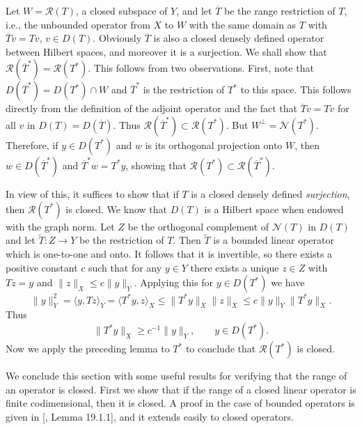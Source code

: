 \begin{Proof}
{Let $W=\mathcal R(T)$, a closed subspace of $Y$, and let $\overline T$ be the range restriction of $T$, i.e., the unbounded operator from $X$ to $W$ with the same domain as $T$ with $\overline Tv=Tv$, $v\in D(T)$. Obviously $\overline T$ is also a closed densely defined operator between Hilbert spaces, and moreover it is a surjection. We shall show that $\mathcal R(\overline T^*)=\mathcal R(T^*)$. This follows from two observations. First, note that $D(\overline T^*)=D(T^*)\cap W$ and $\overline T^*$ is the restriction of $T^*$ to this space. This follows directly from the definition of the adjoint operator and the fact that $\overline Tv=Tv$ for all $v$ in $D(T)=D(\overline T)$. Thus $\mathcal R(\overline T^*)\subset\mathcal R(T^*)$. But $W^\perp=\mathcal N(T^*)$. Therefore, if $y\in D(T^*)$ and $w$ is its orthogonal projection onto $W$, then $w\in D(\overline T^*)$ and $\overline T^*w=T^*y$, showing that $\mathcal R(T^*)\subset\mathcal R(\overline T^*)$.}

{In view of this, it suffices to show that if $T$ is a closed densely defined \emph{surjection}, then $\mathcal R(T^*)$ is closed. We know that $D(T)$ is a Hilbert space when endowed with the graph norm. Let $Z$ be the orthogonal complement of $\mathcal N(T)$ in $D(T)$ and let $\widetilde T:Z\to Y$ be the restriction of $T$. Then $\widetilde T$ is a bounded linear operator which is one-to-one and onto. It follows that it is invertible, so there exists a positive constant $c$ such that for any $y\in Y$ there exists a unique $z\in Z$ with $Tz=y$ and $\|z\|_X\leq c\|y\|_Y$. Applying this for $y\in D(T^*)$ we have}
\[
\|y\|_Y^2=\langle y,Tz\rangle_Y=\langle T^*y,z\rangle_X\leq\|T^*y\|_X\|z\|_X\leq c\|y\|_Y\|T^*y\|_X.
\]
{Thus}
\[
\|T^*y\|_X\geq c^{-1}\|y\|_Y,\qquad y\in D(T^*).
\]
{Now we apply the preceding lemma to $T^*$ to conclude that $\mathcal R(T^*)$ is closed.}
\end{Proof}

{We conclude this section with some useful results for verifying that the range of an operator is closed. First we show that if the range of a closed linear operator is finite codimensional, then it is closed. A proof in the case of bounded operators is given in [, Lemma 19.1.1], and it extends easily to closed operators.}

